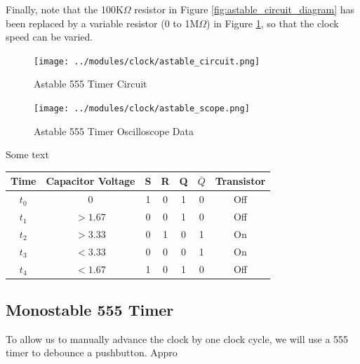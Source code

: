 \documentclass[12pt]{article}
\begin{document}
\begin{FlushLeft}
\vspace{0.3cm}

Finally, note that the 100K$\Omega$ resistor in Figure \ref{fig:astable_circuit_diagram} has been replaced by a variable resistor (0 to 1M$\Omega$) in Figure \ref{fig:astable_circuit}, so that the clock speed can be varied. 


\begin{figure}[h]
  \begin{center}
    \texttt{[image: ../modules/clock/astable\_circuit.png]}
    \caption{Astable 555 Timer Circuit}
    \label{fig:astable_circuit}
  \end{center}
\end{figure}

\begin{figure}[h]
  \begin{center}
    \texttt{[image: ../modules/clock/astable\_scope.png]}
    \caption{Astable 555 Timer Oscilloscope Data}
    \label{fig:astable_scope}
  \end{center}
\end{figure}

Some text

\begin{center}
  \begin{tabular}{ c | c c c c c c }
    Time & Capacitor Voltage & S & R & Q & $\overline Q$ & Transistor \\
    \hline
    $t_0$ & 0       & 1 & 0 & 1 & 0 & Off \\
    $t_1$ & $>1.67$ & 0 & 0 & 1 & 0 & Off \\
    $t_2$ & $>3.33$ & 0 & 1 & 0 & 1 & On  \\
    $t_3$ & $<3.33$ & 0 & 0 & 0 & 1 & On  \\
    $t_4$ & $<1.67$ & 1 & 0 & 1 & 0 & Off \\
  \end{tabular}
\end{center}

    

\clearpage


\subsection{Monostable 555 Timer}
To allow us to manually advance the clock by one clock cycle, we will use a 555 timer to debounce a pushbutton. Appro


\end{FlushLeft}

\clearpage
\end{document}
